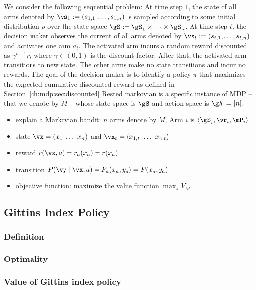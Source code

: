 We consider the following sequential problem: At time step $1$, the state of all arms denoted by $\vs_1:=(s_{1,1},\dots,s_{1,n})$ is sampled according to some initial distribution $\rho$ over the state space $\gS:=\gS_1\times\dots\times\gS_n$.
At time step $t$, the decision maker observes the current of all arms denoted by $\vs_t:=(s_{t,1},\dots,s_{t,n})$ and activates one arm $a_t$.
The activated arm incurs a random reward discounted as $\gamma^{t-1}r_t$ where $\gamma\in(0,1)$ is the discount factor.
After that, the activated arm transitions to new state. %
The other arms make no state transitions and incur no rewards.
The goal of the decision maker is to identify a policy $\pi$ that maximizes the expected cumulative discounted reward as defined in Section~\ref{ch:mdp:sec:discounted}
Rested markovian is a specific instance of MDP -- that we denote by $M$ -- whose state space is $\gS$ and action space is $\gA:=[n]$.

\begin{itemize}
    \item explain a Markovian bandit: $n$ arms denote by $M$, Arm $i$ is $\langle\gS_i, \vr_i,\mP_i\rangle$
    \item state $\vx=(x_1\ \dots\ x_n)$ and $\vx_t=(x_{1,t}\ \dots\ x_{n,t})$
    \item reward $r(\vx, a)=r_a(x_a)=r(x_a)$
    \item transition $P(\vy \mid\vx,a)=P_a(x_a,y_a)=P(x_a,y_a)$
    \item objective function: maximize the value function $\max_{\pi}V^\pi_M$ 
\end{itemize}

\subsection{Gittins Index Policy}
\label{subsec:gittins_idx}

\subsubsection{Definition}

\subsubsection{Optimality}

\subsubsection{Value of Gittins index policy}

